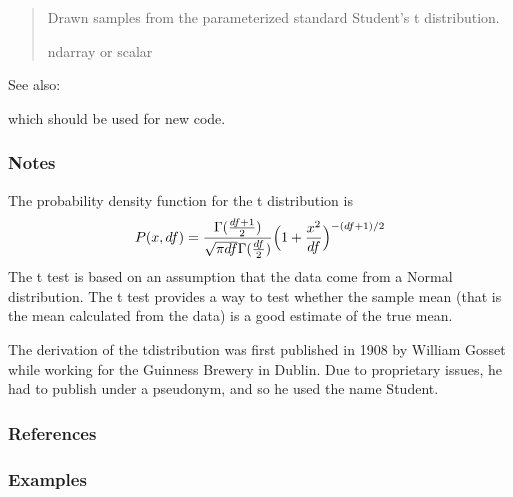 \documentclass[letterpaper,10pt,english]{sphinxmanual}
\begin{document}
\begin{fulllineitems}
\begin{quote}
\begin{description}
\begin{itemize}
\end{itemize}

\sphinxAtStartPar
{} \textendash{} Drawn samples from the parameterized standard Student’s t distribution.

\sphinxAtStartPar
ndarray or scalar

\end{description}\end{quote}


\begin{sphinxseealso}{See also:}
\begin{description}
\sphinxAtStartPar
which should be used for new code.

\end{description}


\end{sphinxseealso}

\subsubsection*{Notes}

\sphinxAtStartPar
The probability density function for the t distribution is
\begin{equation*}
\begin{split}P(x, df) = \frac{\Gamma(\frac{df+1}{2})}{\sqrt{\pi df}
\Gamma(\frac{df}{2})}\Bigl( 1+\frac{x^2}{df} \Bigr)^{-(df+1)/2}\end{split}
\end{equation*}
\sphinxAtStartPar
The t test is based on an assumption that the data come from a
Normal distribution. The t test provides a way to test whether
the sample mean (that is the mean calculated from the data) is
a good estimate of the true mean.

\sphinxAtStartPar
The derivation of the t\sphinxhyphen{}distribution was first published in
1908 by William Gosset while working for the Guinness Brewery
in Dublin. Due to proprietary issues, he had to publish under
a pseudonym, and so he used the name Student.
\subsubsection*{References}
\subsubsection*{Examples}


\end{fulllineitems}
\end{document}
